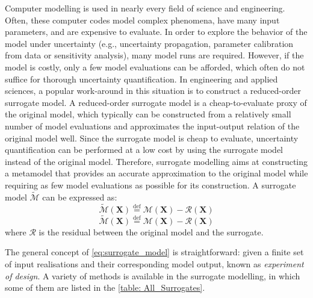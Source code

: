 Computer modelling is used in nearly every field of science and engineering. Often, these computer codes model complex phenomena, have many input parameters,
and are expensive to evaluate. In order to explore the behavior of the model under uncertainty (e.g., uncertainty propagation, parameter calibration from data or sensitivity analysis), many
model runs are required. However, if the model is costly, only a few model evaluations can be afforded, which often do not suffice for thorough uncertainty quantification. In engineering and applied sciences, a popular work-around in this situation is to construct a reduced-order surrogate model. A reduced-order surrogate model is a cheap-to-evaluate proxy of the original model, which typically can be constructed from a relatively small number of model evaluations and approximates
the input-output relation of the original model well. Since the surrogate model is cheap to evaluate, uncertainty quantification can be performed at a low cost by using the surrogate
model instead of the original model. Therefore, surrogate modelling aims at constructing a metamodel that provides an accurate approximation to the original model while requiring as few model evaluations as possible for its construction. A surrogate model $\tilde{\mathcal{M}}$ can be expressed as:
\begin{equation}
\label{eq:surrogate_model}
    \tilde{\mathcal{M}}(\boldsymbol{X})  \overset{\mathrm{def}}{=} \mathcal{M}(\boldsymbol{X}) - \mathcal{R}(\boldsymbol{X})
\end{equation}
\begin{equation}
\label{eq:surrogate_model}
    \tilde{\mathcal{M}}(\boldsymbol{X})  \overset{\mathrm{def}}{=} \mathcal{M}(\boldsymbol{X}) - \mathcal{R}(\boldsymbol{X})
\end{equation}
where $\mathcal{R}$ is the residual between the original model and the surrogate.




The general concept of \cref{eq:surrogate_model} is straightforward: given a finite set of input realisations and their corresponding model output, known as \textit{experiment of design}. A variety of methods is available in the surrogate modelling, in which some of them are listed in the \cref{table: All_Surrogates}.


